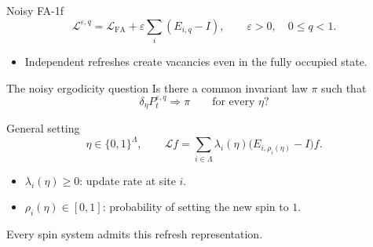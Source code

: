 \documentclass[t,aspectratio=169,11pt]{beamer}
\newcommand{\Lcal}{\mathcal L}
\newenvironment{talkpoints}{\begin{itemize}\setlength{\itemsep}{.65em}}{\end{itemize}}
\begin{document}
\begin{frame}[label=opening-noise]{Noisy FA-1f}
\begin{equation*}
\Lcal^{\varepsilon,q}
=\Lcal_{\mathrm{FA}}+\varepsilon\sum_i(E_{i,q}-I),
\qquad \varepsilon>0,\quad 0\leq q<1.
\end{equation*}
\begin{talkpoints}
\item Independent refreshes create vacancies even in the fully occupied state.
\end{talkpoints}
\medskip
\begin{block}{The noisy ergodicity question}
Is there a common invariant law $\pi$ such that
\begin{equation*}
\delta_\eta P_t^{\varepsilon,q}\Longrightarrow\pi
\qquad\text{for every }\eta?
\end{equation*}
\end{block}
\note{\OpeningNoiseScript}
\end{frame}

\begin{frame}[label=results-setting]{General setting}
\begin{equation*}
\eta\in\{0,1\}^{\Lambda},\qquad
\Lcal f=\sum_{i\in\Lambda}\lambda_i(\eta)
\bigl(E_{i,\rho_i(\eta)}-I\bigr)f.
\end{equation*}
\medskip
\begin{talkpoints}
\item $\lambda_i(\eta)\geq0$: update rate at site $i$.
\item $\rho_i(\eta)\in[0,1]$: probability of setting the new spin to $1$.
\end{talkpoints}
\medskip
Every spin system admits this refresh representation.
\note{\ResultsSettingScript}
\end{frame}
\end{document}
